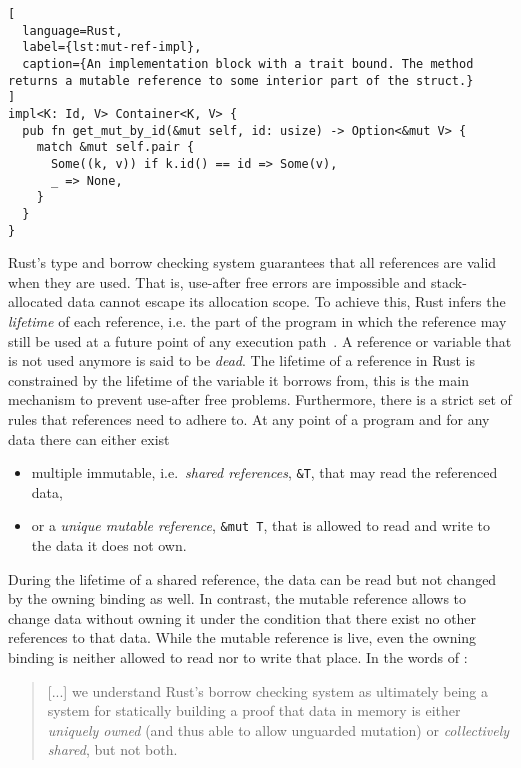\begin{lstlisting}[
  language=Rust,
  label={lst:mut-ref-impl},
  caption={An implementation block with a trait bound. The method returns a mutable reference to some interior part of the struct.}
]
impl<K: Id, V> Container<K, V> {
  pub fn get_mut_by_id(&mut self, id: usize) -> Option<&mut V> {
    match &mut self.pair {
      Some((k, v)) if k.id() == id => Some(v),
      _ => None,
    }
  }
}
\end{lstlisting}

Rust's type and borrow checking system guarantees that all references are valid
when they are used. That is, use-after free errors are impossible and
stack-allocated data cannot escape its allocation scope. To achieve this, Rust
infers the \emph{lifetime} of each reference, i.e. the part of the program in
which the reference may still be used at a future point of any execution
path~\cite{wiki:live-vars}. A reference or variable that is not used anymore is
said to be \emph{dead}. The lifetime of a reference in Rust is constrained by
the lifetime of the variable it borrows from, this is the main  mechanism to
prevent use-after free problems. Furthermore, there is a strict set of rules
that references need to adhere to. At any point of a program and for any data
there can either exist

\begin{itemize}
\tightlist
\item multiple immutable, i.e.~\emph{shared references}, \lstinline!&T!,  that
may read the referenced data,

\item or a \emph{unique mutable reference}, \passthrough{\lstinline!&mut T!},
that is allowed to read and write to the data it does not own.
\end{itemize}

During the lifetime of a shared reference, the data can be read but not changed
by the owning binding as well. In contrast, the mutable reference allows to
change data without owning it under the condition that there exist no other
references to that data. While the mutable reference is live, even the owning
binding is neither allowed to read nor to write that place. In the words of
\citet{oxide}:

\begin{quote}
{[...]} we understand Rust's borrow checking system as ultimately being a system
for statically building a proof that data in memory is either
\emph{uniquely owned} (and thus able to allow unguarded mutation) or
\emph{collectively shared}, but not both.
\end{quote}


